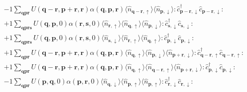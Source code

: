 \begin{align*}
	&-1 \sum_{ \mathbf{q} \mathbf{p} \mathbf{r} } U( \mathbf{q}-\mathbf{r}, \mathbf{p}+\mathbf{r}, \mathbf{r} )  \alpha( \mathbf{q}, \mathbf{p}, \mathbf{r} )   \langle \hat{n}_{ \mathbf{q}-\mathbf{r}, \uparrow } \rangle \langle \hat{n}_{ \mathbf{p}, \downarrow } \rangle :\hat{c}_{ \mathbf{p}-\mathbf{r}, \downarrow }^\dagger \hat{c}_{ \mathbf{p}-\mathbf{r}, \downarrow }^{\phantom{\dagger}}: \\
	&+1 \sum_{ \mathbf{q} \mathbf{p} \mathbf{r} \mathbf{s} } U( \mathbf{q}, \mathbf{p}, 0 )  \alpha( \mathbf{r}, \mathbf{s}, 0 )   \langle \hat{n}_{ \mathbf{r}, \uparrow } \rangle \langle \hat{n}_{ \mathbf{q}, \uparrow } \rangle \langle \hat{n}_{ \mathbf{p}, \downarrow } \rangle :\hat{c}_{ \mathbf{s}, \downarrow }^\dagger \hat{c}_{ \mathbf{s}, \downarrow }^{\phantom{\dagger}}: \\
	&+1 \sum_{ \mathbf{q} \mathbf{p} \mathbf{r} \mathbf{s} } U( \mathbf{q}, \mathbf{p}, 0 )  \alpha( \mathbf{r}, \mathbf{s}, 0 )   \langle \hat{n}_{ \mathbf{s}, \downarrow } \rangle \langle \hat{n}_{ \mathbf{r}, \uparrow } \rangle \langle \hat{n}_{ \mathbf{q}, \uparrow } \rangle :\hat{c}_{ \mathbf{p}, \downarrow }^\dagger \hat{c}_{ \mathbf{p}, \downarrow }^{\phantom{\dagger}}: \\
	&+1 \sum_{ \mathbf{q} \mathbf{p} \mathbf{r} } U( \mathbf{q}-\mathbf{r}, \mathbf{p}+\mathbf{r}, \mathbf{r} )  \alpha( \mathbf{q}, \mathbf{p}, \mathbf{r} )   \langle \hat{n}_{ \mathbf{q}, \uparrow } \rangle \langle \hat{n}_{ \mathbf{p}, \downarrow } \rangle \langle \hat{n}_{ \mathbf{p}+\mathbf{r}, \downarrow } \rangle :\hat{c}_{ \mathbf{q}-\mathbf{r}, \uparrow }^\dagger \hat{c}_{ \mathbf{q}-\mathbf{r}, \uparrow }^{\phantom{\dagger}}: \\
	&+1 \sum_{ \mathbf{q} \mathbf{p} \mathbf{r} } U( \mathbf{q}-\mathbf{r}, \mathbf{p}+\mathbf{r}, \mathbf{r} )  \alpha( \mathbf{q}, \mathbf{p}, \mathbf{r} )   \langle \hat{n}_{ \mathbf{q}, \uparrow } \rangle \langle \hat{n}_{ \mathbf{q}-\mathbf{r}, \uparrow } \rangle \langle \hat{n}_{ \mathbf{p}+\mathbf{r}, \downarrow } \rangle :\hat{c}_{ \mathbf{p}, \downarrow }^\dagger \hat{c}_{ \mathbf{p}, \downarrow }^{\phantom{\dagger}}: \\
	&-1 \sum_{ \mathbf{q} \mathbf{p} \mathbf{r} } U( \mathbf{p}, \mathbf{q}, 0 )  \alpha( \mathbf{p}, \mathbf{r}, 0 )   \langle \hat{n}_{ \mathbf{q}, \downarrow } \rangle \langle \hat{n}_{ \mathbf{p}, \uparrow } \rangle \langle \hat{n}_{ \mathbf{p}, \uparrow } \rangle :\hat{c}_{ \mathbf{r}, \downarrow }^\dagger \hat{c}_{ \mathbf{r}, \downarrow }^{\phantom{\dagger}}: \\

\end{align*}
